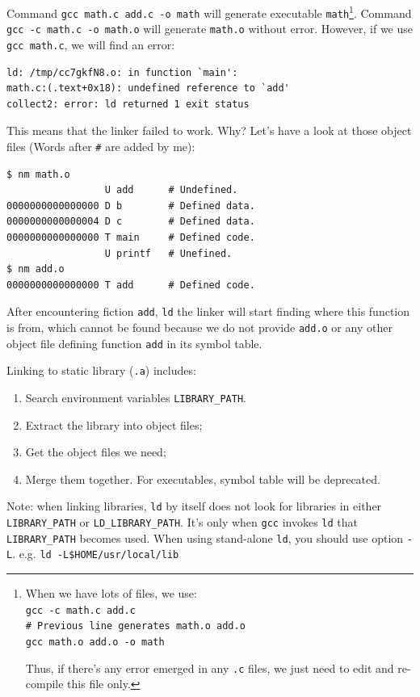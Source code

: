 \documentclass[]{article}
\begin{document}
Command \verb|gcc math.c add.c -o math| will generate executable \verb|math|\footnote{When we have lots of files, we use:\\{\tt gcc -c math.c add.c\\\# Previous line generates math.o add.o\\gcc math.o add.o -o math}\par Thus, if there's any error emerged in any {\tt .c} files, we just need to edit and re-compile this file only.}. Command \verb|gcc -c math.c -o math.o| will generate \verb|math.o| without error. However, if we use \verb|gcc math.c|, we will find an error:

\begin{verbatim}
ld: /tmp/cc7gkfN8.o: in function `main':
math.c:(.text+0x18): undefined reference to `add'
collect2: error: ld returned 1 exit status
\end{verbatim}

This means that the linker failed to work. Why? Let's have a look at those object files (Words after \verb|#| are added by me):

\begin{verbatim}
$ nm math.o
                 U add      # Undefined.
0000000000000000 D b        # Defined data.
0000000000000004 D c        # Defined data.
0000000000000000 T main     # Defined code.
                 U printf   # Unefined.
$ nm add.o
0000000000000000 T add      # Defined code.
\end{verbatim}

After encountering fiction \verb|add|, \verb|ld| the linker will start finding where this function is from, which cannot be found because we do not provide \verb|add.o| or any other object file defining function \verb|add| in its symbol table.

Linking to static library (\verb|.a|) includes:

\begin{enumerate}
\item Search environment variables \verb|LIBRARY_PATH|.
\item Extract the library into object files;
\item Get the object files we need;
\item Merge them together. For executables, symbol table will be deprecated.
\end{enumerate}

Note: when linking libraries, \verb|ld| by itself does not look for libraries in either \verb|LIBRARY_PATH| or \verb|LD_LIBRARY_PATH|. It's only when \verb|gcc| invokes \verb|ld| that \verb|LIBRARY_PATH| becomes used. When using stand-alone \verb|ld|, you should use option \verb|-L|. e.g. \verb|ld -L$HOME/usr/local/lib|
\end{document}
